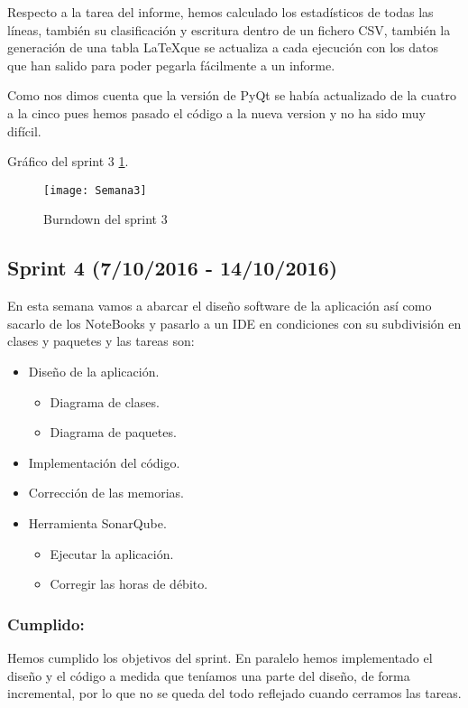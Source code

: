 Respecto a la tarea del informe, hemos calculado los estadísticos de todas las líneas, también su clasificación y escritura dentro de un fichero CSV, también la generación de una tabla \LaTeX que se actualiza a cada ejecución con los datos que han salido para poder pegarla fácilmente a un informe.

Como nos dimos cuenta que la versión de PyQt se había actualizado de la cuatro a la cinco pues hemos pasado el código a la nueva version y no ha sido muy difícil.

Gráfico del sprint 3 \ref{fig:A.2.3}.
\begin{figure}[h]
\centering
\texttt{[image: Semana3]}
\caption{Burndown del sprint 3}
\label{fig:A.2.3}
\end{figure}


\subsection{Sprint 4 (7/10/2016 - 14/10/2016)}
En esta semana vamos a abarcar el diseño software de la aplicación así como sacarlo de los NoteBooks y pasarlo a un IDE en condiciones con su subdivisión en clases y paquetes y las tareas son:
\begin{itemize}
	\item Diseño de la aplicación.
		\begin{itemize}
			\item Diagrama de clases.
			\item Diagrama de paquetes.
		\end{itemize}
		
	\item Implementación del código.
		
	\item Corrección de las memorias.
	
	\item Herramienta SonarQube.
	\begin{itemize}
		\item Ejecutar la aplicación.
		\item Corregir las horas de débito.
	\end{itemize}
\end{itemize}
\subsubsection{Cumplido:}
Hemos cumplido los objetivos del sprint.
En paralelo hemos implementado el diseño y el código a medida que teníamos una parte del diseño, de forma incremental, por lo que no se queda del todo reflejado cuando cerramos las tareas.\\

